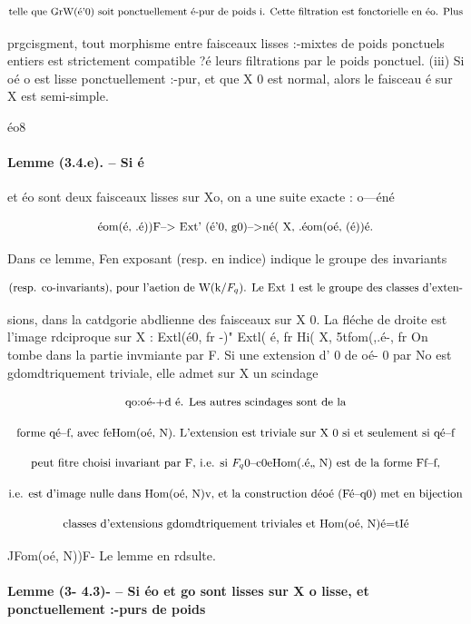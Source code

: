 \documentclass[11pt]{article}
\theoremstyle{remark}
\begin{document}
\[\text{\small telle que GrW(é'0) soit ponctuellement é-pur de poids i. Cette filtration est fonctorielle en éo. Plus}\]

prgcisgment, tout morphisme entre faisceaux lisses :-mixtes de poids ponctuels entiers est strictement compatible ?é leurs filtrations par le poids ponctuel. (iii) Si oé o est lisse ponctuellement :-pur, et que X 0 est normal, alors le faisceau é sur X est semi-simple.

éo8

\paragraph{Lemme (3.4.e). -- Si é}

et éo sont deux faisceaux lisses sur Xo, on a une suite exacte : o---éné

\[\text{\small éom(é, .é))F--> Ext' (é'0, g0)-->né( X, .éom(oé, (é))é.}\]

Dans ce lemme, Fen exposant (resp. en indice) indique le groupe des invariants

\[\text{\small (resp. co-invariants), pour l'aetion de W(k/\(F_q\)). Le Ext 1 est le groupe des classes d'exten-}\]

sions, dans la catdgorie abdlienne des faisceaux sur X 0. La fléche de droite est l'image rdciproque sur X : Extl(é0, fr -)" Extl( é, fr Hi( X, 5tfom(,.é-, fr On tombe dans la partie invmiante par F. Si une extension d' 0 de oé- 0 par No est gdomdtriquement triviale, elle admet sur X un scindage

\[\text{\small qo:oé-+d é. Les autres scindages sont de la}\]

\[\text{\small forme qé--f, avec feHom(oé, N). L'extension est triviale sur X 0 si et seulement si qé--f}\]

\[\text{\small peut fitre choisi invariant par F, i.e. si \(F_q\)0--c0eHom(.é,, N) est de la forme Ff--f,}\]

\[\text{\small i.e. est d'image nulle dans Hom(oé, N)v, et la construction déoé (Fé--q0) met en bijection}\]

\[\text{\small classes d'extensions gdomdtriquement triviales et Hom(oé, N)é=tIé}\]

JFom(oé, N))F- Le lemme en rdsulte.

\paragraph{Lemme (3- 4.3)- -- Si éo et go sont lisses sur X o lisse, et ponctuellement :-purs de poids}
\end{document}
